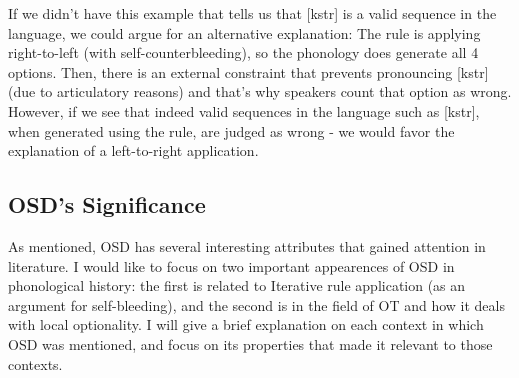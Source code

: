 \documentclass{article}
\begin{document}
If we didn't have this example that tells us that [kstr] is a valid sequence in the language, we could argue for an alternative explanation: The rule is applying right-to-left (with self-counterbleeding), so the phonology does generate all 4 options. Then, there is an external constraint that prevents pronouncing [kstr] (due to articulatory reasons) and that's why speakers count that option as wrong. However, if we see that indeed valid sequences in the language such as [kstr], when generated using the rule, are judged as wrong - we would favor the explanation of a left-to-right application.  

\subsection{OSD's Significance} %
As mentioned, OSD has several interesting attributes that gained attention in literature.  I would like to focus on two important appearences of OSD in phonological history: the first is related to Iterative rule application (as an argument for self-bleeding),  and the second is in the field of OT and how it deals with local optionality. I will give a brief explanation on each context in which OSD was mentioned, and focus on its properties that made it relevant to those contexts.\\
\end{document}
